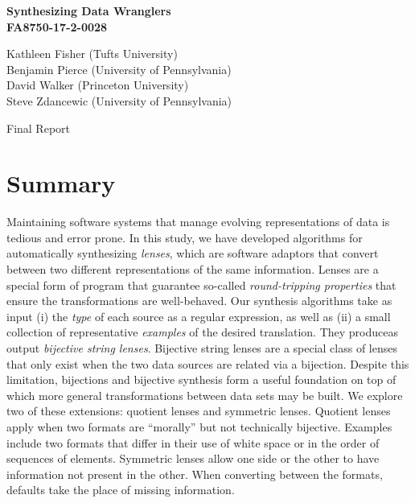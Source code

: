 \documentclass[12pt]{article}
\begin{document}
\pagestyle{empty}

\begin{center}

  \large \textbf{Synthesizing Data Wranglers\\\vspace{1cm} FA8750-17-2-0028}

  \vspace{1in}

  \normalsize
  Kathleen Fisher (Tufts University) \\
  Benjamin Pierce  (University of Pennsylvania) \\
  David Walker (Princeton University) \\
  Steve Zdancewic (University of Pennsylvania)
  \vspace{1in}

  Final Report

\end{center}

\newpage
\pagestyle{plain}

\renewcommand{\thepage}{\roman{page}}%
\setcounter{page}{1}%

\tableofcontents
\newpage

\listoffigures
\newpage

\renewcommand{\thepage}{\arabic{page}}%
\setcounter{page}{1}%

\section{Summary}

Maintaining software systems that manage evolving representations of
data is tedious and error prone.  In this study, we have developed
algorithms for automatically synthesizing \emph{lenses}, which are
software adaptors that convert between two different representations
of the same information.  Lenses are a special form of program that
guarantee so-called \emph{round-tripping properties} that ensure the
transformations are well-behaved.  Our synthesis algorithms take as
input (i) the \emph{type} of each source as a regular expression, as
well as (ii) a small collection of representative \emph{examples} of
the desired translation.  They produceas output \emph{bijective string
  lenses}.  Bijective string lenses are a special class of lenses that
only exist when the two data sources are related via a bijection.
Despite this limitation, bijections and bijective synthesis form a
useful foundation on top of which more general transformations between
data sets may be built.  We explore two of these extensions: quotient
lenses and symmetric lenses.  Quotient lenses apply when two formats
are ``morally'' but not technically bijective.  Examples include two
formats that differ in their use of white space or in the order of
sequences of elements.  Symmetric lenses allow one side or the other to have
information not present in the other.  When converting between the
formats, defaults take the place of missing information. 
\end{document}

